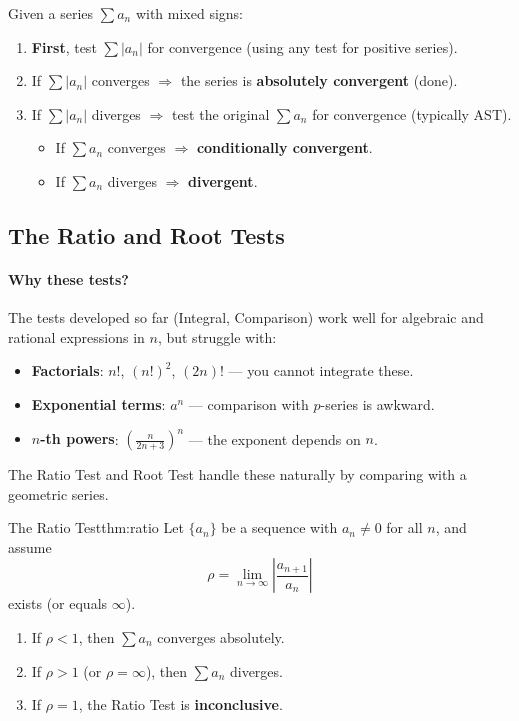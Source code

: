 \begin{examtip}[title={Exam Focus: Classification workflow (absolute / conditional / divergent)}]
Given a series $\sum a_n$ with mixed signs:
\begin{enumerate}[leftmargin=3em]
\item \textbf{First}, test $\sum |a_n|$ for convergence (using any test for positive series).
\item If $\sum |a_n|$ converges $\Rightarrow$ the series is \textbf{absolutely convergent} (done).
\item If $\sum |a_n|$ diverges $\Rightarrow$ test the original $\sum a_n$ for convergence (typically AST).
\begin{itemize}
\item If $\sum a_n$ converges $\Rightarrow$ \textbf{conditionally convergent}.
\item If $\sum a_n$ diverges $\Rightarrow$ \textbf{divergent}.
\end{itemize}
\end{enumerate}
\end{examtip}

\subsection{The Ratio and Root Tests}

\paragraph{Why these tests?}
The tests developed so far (Integral, Comparison) work well for algebraic and rational expressions in $n$, but struggle with:
\begin{itemize}[leftmargin=*]
\item \textbf{Factorials}: $n!$, $(n!)^2$, $(2n)!$ --- you cannot integrate these.
\item \textbf{Exponential terms}: $a^n$ --- comparison with $p$-series is awkward.
\item \textbf{$n$-th powers}: $\left(\frac{n}{2n+3}\right)^n$ --- the exponent depends on $n$.
\end{itemize}
The Ratio Test and Root Test handle these naturally by comparing with a geometric series.

\begin{theorem}{The Ratio Test}{thm:ratio}
Let $\{a_n\}$ be a sequence with $a_n\ne 0$ for all $n$, and assume
\[
\rho=\lim_{n\to\infty}\left|\frac{a_{n+1}}{a_n}\right|
\]
exists (or equals $\infty$).
\begin{enumerate}[label=(\roman*), leftmargin=3em]
\item If $\rho<1$, then $\sum a_n$ converges absolutely.
\item If $\rho>1$ (or $\rho=\infty$), then $\sum a_n$ diverges.
\item If $\rho=1$, the Ratio Test is \textbf{inconclusive}.
\end{enumerate}
\end{theorem}


